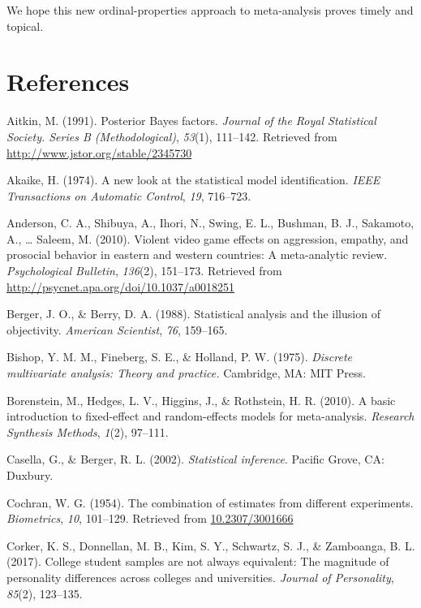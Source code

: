 \documentclass[english,man]{apa6}
\theoremstyle{definition}
\theoremstyle{definition}
\theoremstyle{definition}
\theoremstyle{remark}
\begin{document}
We hope this new ordinal-properties approach to meta-analysis proves
timely and topical.

\newpage

\section*{References}\label{references}

\hypertarget{refs}{}
\hypertarget{ref-Aitkin:1991}{}
Aitkin, M. (1991). Posterior Bayes factors. \emph{Journal of the Royal
Statistical Society. Series B (Methodological)}, \emph{53}(1), 111--142.
Retrieved from \url{http://www.jstor.org/stable/2345730}

\hypertarget{ref-Akaike:1974}{}
Akaike, H. (1974). A new look at the statistical model identification.
\emph{IEEE Transactions on Automatic Control}, \emph{19}, 716--723.

\hypertarget{ref-Anderson:etal:2010}{}
Anderson, C. A., Shibuya, A., Ihori, N., Swing, E. L., Bushman, B. J.,
Sakamoto, A., \ldots{} Saleem, M. (2010). Violent video game effects on
aggression, empathy, and prosocial behavior in eastern and western
countries: A meta-analytic review. \emph{Psychological Bulletin},
\emph{136}(2), 151--173. Retrieved from
\url{http://psycnet.apa.org/doi/10.1037/a0018251}

\hypertarget{ref-Berger:Berry:1988}{}
Berger, J. O., \& Berry, D. A. (1988). Statistical analysis and the
illusion of objectivity. \emph{American Scientist}, \emph{76}, 159--165.

\hypertarget{ref-Bishop:etal:1975}{}
Bishop, Y. M. M., Fineberg, S. E., \& Holland, P. W. (1975).
\emph{Discrete multivariate analysis: Theory and practice.} Cambridge,
MA: MIT Press.

\hypertarget{ref-Borenstein:etal:2010}{}
Borenstein, M., Hedges, L. V., Higgins, J., \& Rothstein, H. R. (2010).
A basic introduction to fixed-effect and random-effects models for
meta-analysis. \emph{Research Synthesis Methods}, \emph{1}(2), 97--111.

\hypertarget{ref-Casella:Berger:2002}{}
Casella, G., \& Berger, R. L. (2002). \emph{Statistical inference}.
Pacific Grove, CA: Duxbury.

\hypertarget{ref-Cochran:1954}{}
Cochran, W. G. (1954). The combination of estimates from different
experiments. \emph{Biometrics}, \emph{10}, 101--129. Retrieved from
\url{10.2307/3001666}

\hypertarget{ref-Corker:etal:2017}{}
Corker, K. S., Donnellan, M. B., Kim, S. Y., Schwartz, S. J., \&
Zamboanga, B. L. (2017). College student samples are not always
equivalent: The magnitude of personality differences across colleges and
universities. \emph{Journal of Personality}, \emph{85}(2), 123--135.
\end{document}
